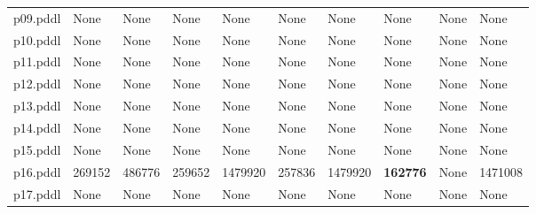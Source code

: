 \documentclass{article}
\begin{document}
\begin{tabular}{@{}lrrrrrrrrr@{}}
p09.pddl & \multicolumn{1}{|l|}{None} & \multicolumn{1}{|l|}{None} & \multicolumn{1}{|l|}{None} & \multicolumn{1}{|l|}{None} & \multicolumn{1}{|l|}{None} & \multicolumn{1}{|l|}{None} & \multicolumn{1}{|l|}{None} & \multicolumn{1}{|l|}{None} & \multicolumn{1}{|l|}{None} \\
p10.pddl & \multicolumn{1}{|l|}{None} & \multicolumn{1}{|l|}{None} & \multicolumn{1}{|l|}{None} & \multicolumn{1}{|l|}{None} & \multicolumn{1}{|l|}{None} & \multicolumn{1}{|l|}{None} & \multicolumn{1}{|l|}{None} & \multicolumn{1}{|l|}{None} & \multicolumn{1}{|l|}{None} \\
p11.pddl & \multicolumn{1}{|l|}{None} & \multicolumn{1}{|l|}{None} & \multicolumn{1}{|l|}{None} & \multicolumn{1}{|l|}{None} & \multicolumn{1}{|l|}{None} & \multicolumn{1}{|l|}{None} & \multicolumn{1}{|l|}{None} & \multicolumn{1}{|l|}{None} & \multicolumn{1}{|l|}{None} \\
p12.pddl & \multicolumn{1}{|l|}{None} & \multicolumn{1}{|l|}{None} & \multicolumn{1}{|l|}{None} & \multicolumn{1}{|l|}{None} & \multicolumn{1}{|l|}{None} & \multicolumn{1}{|l|}{None} & \multicolumn{1}{|l|}{None} & \multicolumn{1}{|l|}{None} & \multicolumn{1}{|l|}{None} \\
p13.pddl & \multicolumn{1}{|l|}{None} & \multicolumn{1}{|l|}{None} & \multicolumn{1}{|l|}{None} & \multicolumn{1}{|l|}{None} & \multicolumn{1}{|l|}{None} & \multicolumn{1}{|l|}{None} & \multicolumn{1}{|l|}{None} & \multicolumn{1}{|l|}{None} & \multicolumn{1}{|l|}{None} \\
p14.pddl & \multicolumn{1}{|l|}{None} & \multicolumn{1}{|l|}{None} & \multicolumn{1}{|l|}{None} & \multicolumn{1}{|l|}{None} & \multicolumn{1}{|l|}{None} & \multicolumn{1}{|l|}{None} & \multicolumn{1}{|l|}{None} & \multicolumn{1}{|l|}{None} & \multicolumn{1}{|l|}{None} \\
p15.pddl & \multicolumn{1}{|l|}{None} & \multicolumn{1}{|l|}{None} & \multicolumn{1}{|l|}{None} & \multicolumn{1}{|l|}{None} & \multicolumn{1}{|l|}{None} & \multicolumn{1}{|l|}{None} & \multicolumn{1}{|l|}{None} & \multicolumn{1}{|l|}{None} & \multicolumn{1}{|l|}{None} \\
p16.pddl & 269152 & 486776 & 259652 & 1479920 & 257836 & 1479920 & \textbf{162776} & \multicolumn{1}{|l|}{None} & 1471008 \\
p17.pddl & \multicolumn{1}{|l|}{None} & \multicolumn{1}{|l|}{None} & \multicolumn{1}{|l|}{None} & \multicolumn{1}{|l|}{None} & \multicolumn{1}{|l|}{None} & \multicolumn{1}{|l|}{None} & \multicolumn{1}{|l|}{None} & \multicolumn{1}{|l|}{None} & \multicolumn{1}{|l|}{None} \\

\end{tabular}
\end{document}
